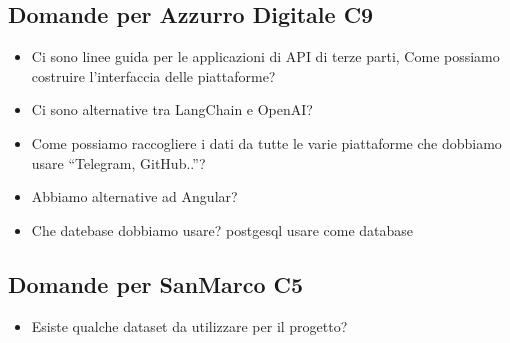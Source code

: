 \documentclass{article}
\begin{document}
\subsection{Domande per Azzurro Digitale C9}\label{subsec:domande-azzurro}
\begin{itemize}
    \item Ci sono linee guida per le applicazioni di API di terze parti, Come possiamo costruire l'interfaccia delle piattaforme?
    \item Ci sono alternative tra LangChain e OpenAI?
    \item Come possiamo raccogliere i dati da tutte le varie piattaforme che dobbiamo usare “Telegram, GitHub..”?
    \item Abbiamo alternative ad Angular? 
    \item Che datebase dobbiamo usare?  postgesql usare come database
\end{itemize}

\subsection{Domande per SanMarco C5}\label{subsec:domande-sanmarco}
\begin{itemize}
    \item Esiste qualche dataset da utilizzare per il progetto?
\end{itemize}
\end{document}
